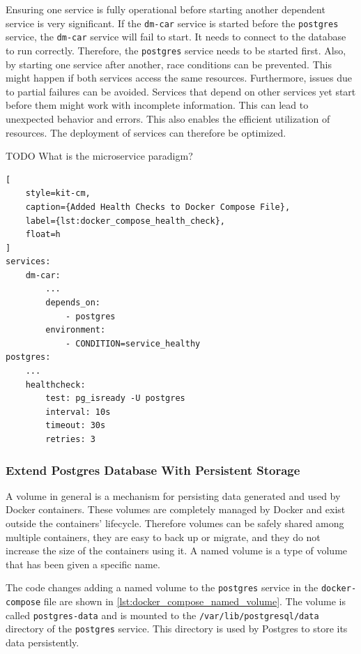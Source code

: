 Ensuring one service is fully operational before starting another dependent service is very significant.
If the \texttt{dm-car} service is started before the \texttt{postgres} service, the \texttt{dm-car} service will fail to start.
It needs to connect to the database to run correctly.
Therefore, the \texttt{postgres} service needs to be started first.
Also, by starting one service after another, race conditions can be prevented.
This might happen if both services access the same resources.
Furthermore, issues due to partial failures can be avoided.
Services that depend on other services yet start before them might work with incomplete information.
This can lead to unexpected behavior and errors.
This also enables the efficient utilization of resources.
The deployment of services can therefore be optimized.

TODO What is the microservice paradigm?

\begin{lstlisting}[
    style=kit-cm,
    caption={Added Health Checks to Docker Compose File},
    label={lst:docker_compose_health_check},
    float=h
]
services:
    dm-car:
        ...
        depends_on:
            - postgres
        environment:
            - CONDITION=service_healthy
postgres:
    ...
    healthcheck:
        test: pg_isready -U postgres
        interval: 10s
        timeout: 30s
        retries: 3
\end{lstlisting}

\subsubsection*{Extend Postgres Database With Persistent Storage}
A volume in general is a mechanism for persisting data generated and used by Docker containers.
These volumes are completely managed by Docker and exist outside the containers' lifecycle.
Therefore volumes can be safely shared among multiple containers, they are easy to back up or migrate, and they do not increase the size of the containers using it.
A named volume is a type of volume that has been given a specific name.

The code changes adding a named volume to the \texttt{postgres} service in the \texttt{docker-compose} file are shown in \autoref*{lst:docker_compose_named_volume}.
The volume is called \texttt{postgres-data} and is mounted to the \texttt{/var/lib/postgresql/data} directory of the \texttt{postgres} service.
This directory is used by Postgres to store its data persistently.

